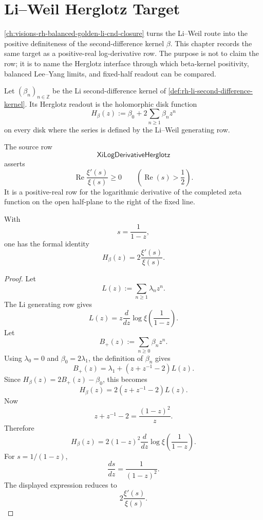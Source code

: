 \chapter{Li--Weil Herglotz Target}
\label{ch:visions-rh-li-weil-herglotz-target}

\autoref{ch:visions-rh-balanced-golden-li-cnd-closure} turns the
Li--Weil route into the positive definiteness of the second-difference
kernel $\beta$.  This chapter records the same target as a positive-real
log-derivative row.  The purpose is not to claim the row; it is to name
the Herglotz interface through which beta-kernel positivity, balanced
Lee--Yang limits, and fixed-half readout can be compared.

\begin{definition}
\label{def:rh-li-beta-herglotz-function}
Let $(\beta_n)_{n\in\mathbb Z}$ be the Li second-difference kernel of
\autoref{def:rh-li-second-difference-kernel}.  Its Herglotz readout is
the holomorphic disk function
$$
H_\beta(z)
:=
\beta_0+2\sum_{n\ge1}\beta_nz^n
$$
on every disk where the series is defined by the Li--Weil generating
row.
\end{definition}

\begin{definition}
\label{def:rh-xi-log-derivative-herglotz-row}
The source row
$$
\mathsf{XiLogDerivativeHerglotz}
$$
asserts
$$
\operatorname{Re}
\frac{\xi'(s)}{\xi(s)}
\ge0
\qquad
\left(\operatorname{Re}(s)>\frac12\right).
$$
It is a positive-real row for the logarithmic derivative of the
completed zeta function on the open half-plane to the right of the
fixed line.
\end{definition}

\begin{theorem}
\label{thm:rh-li-beta-readout-xi-log-derivative}
With
$$
s=\frac{1}{1-z},
$$
one has the formal identity
$$
H_\beta(z)
=
2\frac{\xi'(s)}{\xi(s)}.
$$
\end{theorem}

\begin{proof}
Let
$$
L(z):=\sum_{n\ge1}\lambda_nz^n.
$$
The Li generating row gives
$$
L(z)
=
z\frac{d}{dz}
\log\xi\left(\frac{1}{1-z}\right).
$$
Let
$$
B_+(z):=\sum_{n\ge0}\beta_nz^n.
$$
Using $\lambda_0=0$ and $\beta_0=2\lambda_1$, the definition of
$\beta_n$ gives
$$
B_+(z)
=
\lambda_1+(z+z^{-1}-2)L(z).
$$
Since $H_\beta(z)=2B_+(z)-\beta_0$, this becomes
$$
H_\beta(z)
=
2(z+z^{-1}-2)L(z).
$$
Now
$$
z+z^{-1}-2
=
\frac{(1-z)^2}{z}.
$$
Therefore
$$
H_\beta(z)
=
2(1-z)^2
\frac{d}{dz}
\log\xi\left(\frac{1}{1-z}\right).
$$
For $s=1/(1-z)$,
$$
\frac{ds}{dz}=\frac{1}{(1-z)^2}.
$$
The displayed expression reduces to
$$
2\frac{\xi'(s)}{\xi(s)}.
$$
\end{proof}

